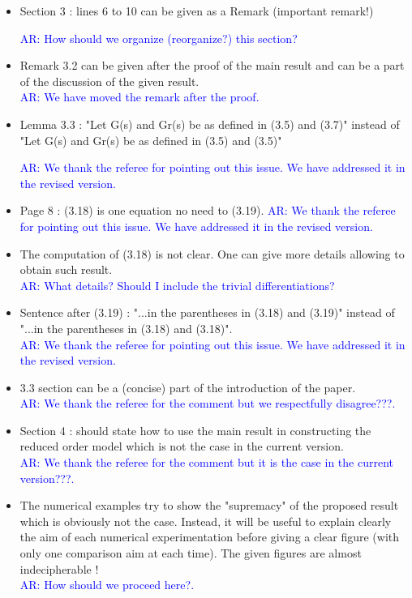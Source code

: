 \documentclass[11pt]{article}
\def\serkan#1{\textcolor{blue}{{#1}}}
\begin{document}
\begin{itemize}
\item Section 3 : lines 6 to 10 can be given as a Remark (important remark!) 

\serkan{\textsf{AR}:  How should we organize (reorganize?) this section? }

\item Remark 3.2 can be given after the proof of the main result and can be
a part of the discussion of the given result. \\
\serkan{\textsf{AR}:  We have moved the remark after the proof. }

\item Lemma 3.3 : "Let G(s) and Gr(s) be as defined in (3.5) and (3.7)"
instead of "Let G(s) and Gr(s) be as defined in (3.5) and (3.5)"

\serkan{\textsf{AR}:  We thank the referee for pointing out this issue. We have addressed it in the revised version.}

\item Page 8 : (3.18) is one equation no need to (3.19).
\serkan{\textsf{AR}:  We thank the referee for pointing out this issue. We have addressed it in the revised version.}

\item The computation of (3.18) is not clear. One can give more details
allowing to obtain such result. \\
\serkan{\textsf{AR}:  What details? Should I include the trivial differentiations?}

\item Sentence after (3.19) : "...in the parentheses in (3.18) and (3.19)"
instead of "...in the parentheses in (3.18) and (3.18)". \\

\serkan{\textsf{AR}:  We thank the referee for pointing out this issue. We have addressed it in the revised version.}

\item 3.3 section can be a (concise) part of the introduction of the paper. \\
\serkan{\textsf{AR}:  We thank the referee for the comment but we respectfully disagree???.}

\item Section 4 : should state how to use the main result in constructing
the reduced order model which is not the case in the current version.\\
\serkan{\textsf{AR}:  We thank the referee for the comment but it is the case in the current version???.}

\item The numerical examples try to show the "supremacy" of the proposed
result which is obviously not the case. Instead, it will be useful to
explain clearly the aim of each numerical experimentation before giving
a clear figure (with only one comparison aim at each time). The given
figures are almost indecipherable !\\

\serkan{\textsf{AR}:  How should we proceed here?.}

\end{itemize}
\end{document}
